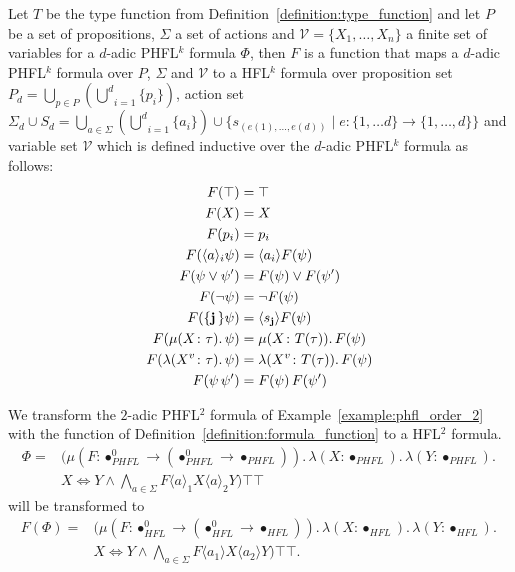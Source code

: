 \begin{definition}
    \label{definition:formula_function}
    Let $T$ be the type function from Definition~\ref{definition:type_function} and let $P$ be a set of propositions,
    $\Sigma$ a set of actions and $\mathcal{V} = \{X_1, \dots, X_n\}$ a finite set of variables for a $d$-adic
    PHFL$^k$ formula $\Phi$, then $F$ is a function that maps a $d$-adic PHFL$^k$ formula over $P$, $\Sigma$ and
    $\mathcal{V}$ to a HFL$^k$ formula over proposition set $P_d = \underset{p \in P}{\bigcup}(\underset{i =
    1}{\overset{d}{\bigcup}} \{p_i\})$, action set $\Sigma_d \cup S_d = \underset{a \in \Sigma}{\bigcup}(\underset{i =
    1}{\overset{d}{\bigcup}} \{a_i\}) \cup \{s_{(e(1), \dots, e(d))} \mid e: \{1, \dots d\} \rightarrow \{1, \dots,
    d\}\}$ and variable set $\mathcal{V}$ which is defined inductive over the $d$-adic PHFL$^k$ formula as follows:
    \begin{align*}
        F(\top) &= \top\\
        F(X) &= X\\
        F(p_i) &= p_i\\
        F(\langle a \rangle_i \psi) &= \langle a_i \rangle F(\psi) \\
        F(\psi \vee \psi') &= F(\psi) \vee F(\psi') \\
        F(\neg \psi) &= \neg F(\psi) \\
        F(\{\emph{j}\,\} \psi) &= \langle s_{\emph{j}} \rangle F(\psi)  \\
        F(\mu (X \colon \tau).\,\psi) &= \mu (X \colon T(\tau)).\,F(\psi) \\
        F(\lambda (X^v \colon \tau).\, \psi) &= \lambda (X^v \colon T(\tau)).\, F(\psi) \\
        F(\psi\,{\psi'}) &= F(\psi)\,F({\psi'})
    \end{align*}
\end{definition}

\begin{example}
    We transform the $2$-adic PHFL$^2$ formula of Example~\ref{example:phfl_order_2} with the function of Definition~\ref{definition:formula_function} to a HFL$^2$ formula.
    \begin{align*}
        \Phi = &(\mu (F \colon \bullet_{PHFL}^0 \rightarrow (\bullet_{PHFL}^0 \rightarrow \bullet_{PHFL})).\,
        \lambda (X \colon \bullet_{PHFL}).\, \lambda (Y \colon \bullet_{PHFL}).\, \\&X \Leftrightarrow Y \wedge
        \underset{a \in \Sigma}{\bigwedge} F \langle a \rangle_1 X \langle a \rangle_2 Y)\top \top
    \end{align*}
    will be transformed to
\begin{align*}
    F(\Phi) = &(\mu (F \colon \bullet_{HFL}^0 \rightarrow (\bullet_{HFL}^0 \rightarrow \bullet_{HFL})).\,
    \lambda (X \colon \bullet_{HFL}).\, \lambda (Y \colon \bullet_{HFL}).\, \\&X \Leftrightarrow Y \wedge \underset{a
    \in \Sigma}{\bigwedge} F \langle a_1 \rangle X \langle a_2 \rangle Y)\top \top.
\end{align*}
\end{example}

